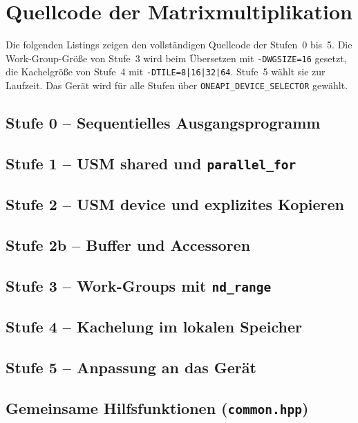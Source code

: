 \documentclass[12pt,a4paper]{article}
\begin{document}
\newpage
{}
\section{Quellcode der Matrixmultiplikation}\label{sec:anhang}

Die folgenden Listings zeigen den vollständigen Quellcode der Stufen~0 bis~5.
Die Work-Group-Größe von Stufe~3 wird beim Übersetzen mit \texttt{-DWGSIZE=16}
gesetzt, die Kachelgröße von Stufe~4 mit \texttt{-DTILE=8|16|32|64}. Stufe~5
wählt sie zur Laufzeit. Das Gerät wird für alle Stufen über
\texttt{ONEAPI\_DEVICE\_SELECTOR} gewählt.

\subsection{Stufe 0 -- Sequentielles Ausgangsprogramm}\label{lst:stufe0}


\subsection{Stufe 1 -- USM shared und \texttt{parallel\_for}}\label{lst:stufe1}


\subsection{Stufe 2 -- USM device und explizites Kopieren}\label{lst:stufe2}


\subsection{Stufe 2b -- Buffer und Accessoren}\label{lst:stufe2b}


\subsection{Stufe 3 -- Work-Groups mit \texttt{nd\_range}}\label{lst:stufe3}


\subsection{Stufe 4 -- Kachelung im lokalen Speicher}\label{lst:stufe4}


\subsection{Stufe 5 -- Anpassung an das Gerät}\label{lst:stufe5}


\subsection{Gemeinsame Hilfsfunktionen (\texttt{common.hpp})}\label{lst:common}

\end{document}
